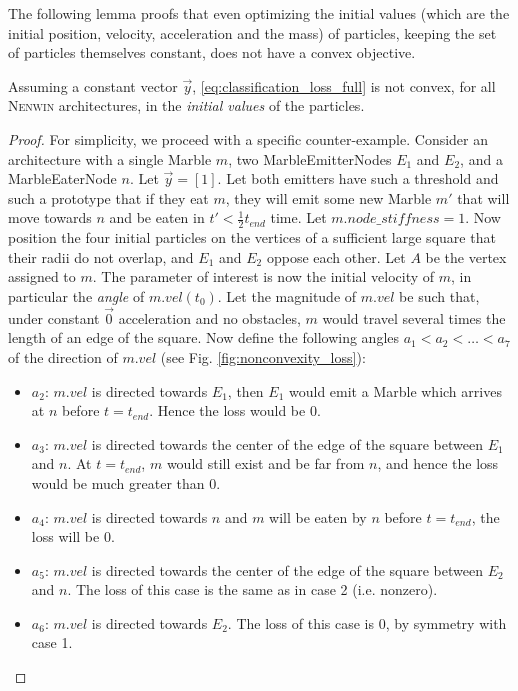 The following lemma proofs that even optimizing the initial values (which are the initial position, velocity, acceleration and the mass) of particles, keeping the set of particles themselves constant, does not have a convex objective.
\begin{lemma}
Assuming a constant vector $\vec{y}$, \eqref{eq:classification_loss_full} is not convex, for all \textsc{Nenwin} architectures, in the \emph{initial values} of the particles.
\label{lemma:nonconvexity_loss}
\end{lemma}
\begin{proof}
For simplicity, we proceed with a specific counter-example. Consider an architecture with a single Marble $m$, two MarbleEmitterNodes $E_1$ and $E_2$, and a MarbleEaterNode $n$. Let $\vec{y} = [1]$. Let both emitters have such a threshold and such a prototype that if they eat $m$, they will emit some new Marble $m'$ that will move towards $n$ and be eaten in $t' < \frac{1}{2}t_{end}$ time. Let $m.node\_stiffness = 1$. Now position the four initial particles on the vertices of a sufficient large square that their radii do not overlap, and $E_1$ and $E_2$ oppose each other. Let $A$ be the vertex assigned to $m$. The parameter of interest is now the initial velocity of $m$, in particular the \emph{angle} of $m.vel(t_0)$. Let the magnitude of $m.vel$ be such that, under constant $\vec{0}$ acceleration and no obstacles, $m$ would travel several times the length of an edge of the square. 
Now define the following angles $a_1 < a_2 < \dots < a_7$ of the direction of $m.vel$ (see Fig. \ref{fig:nonconvexity_loss}):
\begin{itemize}
    \item $a_2$: $m.vel$ is directed towards $E_1$, then $E_1$ would emit a Marble which arrives at $n$ before $t = t_{end}$. Hence the loss would be 0.
    \item $a_3$: $m.vel$ is directed towards the center of the edge of the square between $E_1$ and $n$. At $t = t_{end}$, $m$ would still exist and be far from $n$, and hence the loss would be much greater than 0.
    \item $a_4$: $m.vel$ is directed towards $n$ and $m$ will be eaten by $n$ before $t = t_{end}$, the loss will be 0.
    \item $a_5$: $m.vel$ is directed towards the center of the edge of the square between $E_2$ and $n$. The loss of this case is the same as in case 2 (i.e. nonzero).
    \item $a_6$: $m.vel$ is directed towards $E_2$. The loss of this case is 0, by symmetry with case 1.

\end{itemize}
\end{proof}
